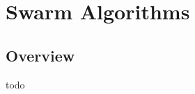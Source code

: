 


\chapter{Swarm Algorithms}
\label{ch:swarm}

\section{Overview}
todo



\newpage
\newpage
\newpage
\newpage
\newpage

